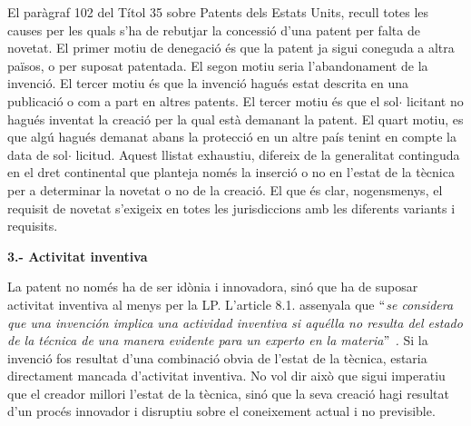 \documentclass[12pt]{article}
\renewcommand{\_}{\kern-1.5pt\textunderscore\kern-1.5pt}
\begin{document}
\begin{itemize}
\vspace{\baselineskip}
\begin{justify}
El paràgraf 102 del Títol 35 sobre Patents dels Estats Units, recull totes les causes per les quals s’ha de rebutjar la concessió d’una patent per falta de novetat. El primer motiu de denegació és que la patent ja sigui coneguda a altra països, o per suposat patentada. El segon motiu seria l’abandonament de la invenció. El tercer motiu és que la invenció hagués estat descrita en una publicació o com a part en altres patents. El tercer motiu és que el sol$ \cdot $ licitant no hagués inventat la creació per la qual està demanant la patent. El quart motiu, es que algú hagués demanat abans la protecció en un altre país tenint en compte la data de sol$ \cdot $ licitud. Aquest llistat exhaustiu, difereix de la generalitat continguda en el dret continental que planteja només la inserció o no en l’estat de la tècnica per a determinar la novetat o no de la creació. El que és clar, nogensmenys, el requisit de novetat s’exigeix en totes les jurisdiccions amb les diferents variants i requisits. 
\end{justify}\par


\vspace{\baselineskip}
\textbf{3.- Activitat inventiva}\par


\vspace{\baselineskip}
La patent no només ha de ser idònia i innovadora, sinó que ha de suposar activitat inventiva al menys per la LP. L’article 8.1. assenyala que $``$\textit{se considera que una invención implica una actividad inventiva si aquélla no resulta del estado de la técnica de una manera evidente para un experto en la materia$"$ . }Si la invenció fos resultat d’una combinació obvia de l’estat de la tècnica, estaria directament mancada d’activitat inventiva. No vol dir això que sigui imperatiu que el creador millori l’estat de la tècnica, sinó que la seva creació hagi resultat d’un procés innovador i disruptiu sobre el coneixement actual i no previsible. \par



\end{itemize}
\end{document}
